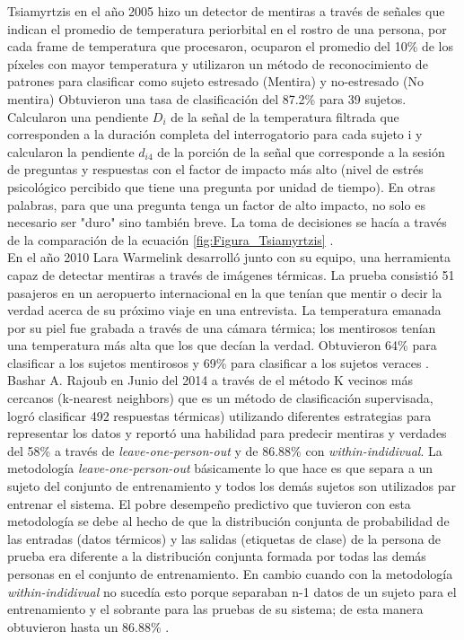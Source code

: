 \begin{onehalfspacing}
Tsiamyrtzis en el año 2005 hizo un detector de mentiras a través de señales que indican el promedio de temperatura periorbital en el rostro de una persona, por cada frame de temperatura que procesaron, ocuparon el promedio del 10\% de los píxeles con mayor temperatura y utilizaron un método de reconocimiento de patrones para clasificar como sujeto estresado (Mentira) y no-estresado (No mentira) Obtuvieron una tasa de clasificación del 87.2\% para 39 sujetos.
Calcularon una pendiente \textit{$D_{i}$} de la señal de la temperatura filtrada que corresponden a la duración completa del interrogatorio para cada sujeto i y calcularon la pendiente \textit{$d_{i4}$} de la porción de la señal que corresponde a la sesión de preguntas y respuestas con el factor de impacto más alto (nivel de estrés psicológico percibido que tiene una pregunta por unidad de tiempo). En otras palabras, para que una pregunta tenga un factor de alto impacto, no solo es necesario ser "duro" sino también breve. La toma de decisiones se hacía a través de la comparación de la ecuación \ref{fig:Figura_Tsiamyrtzis}
\cite{Tsiamyrtzis2005LieVideo}.\\

En el año 2010 Lara Warmelink desarrolló junto con su equipo, una herramienta capaz de detectar mentiras a través de imágenes térmicas. La prueba consistió 51 pasajeros en un aeropuerto internacional en la que tenían que mentir o decir la verdad acerca de su próximo viaje en una entrevista. La temperatura emanada por su piel fue grabada a través de una cámara térmica; los mentirosos tenían una temperatura más alta que los que decían la verdad. Obtuvieron 64\% para clasificar a los sujetos mentirosos y 69\% para clasificar a los sujetos veraces \cite{Warmelink2011ThermalAirports}.\\

Bashar A. Rajoub en Junio del 2014 a través de el método K vecinos más cercanos (k-nearest neighbors) que es un método de clasificación supervisada, logró clasificar 492 respuestas térmicas) utilizando diferentes estrategias para representar los datos y reportó una habilidad para predecir mentiras y verdades del 58\% a través de \textit{leave-one-person-out} y de 86.88\% con \textit{within-indidivual}. La metodología \textit{leave-one-person-out} básicamente lo que hace es que separa a un sujeto del conjunto de entrenamiento y todos los demás sujetos son utilizados par entrenar el sistema. El pobre desempeño predictivo que tuvieron con esta metodología se debe al hecho de que la distribución conjunta de probabilidad de las entradas (datos térmicos) y las salidas (etiquetas de clase) de la persona de prueba era diferente a la distribución conjunta formada por todas las demás personas en el conjunto de entrenamiento. En cambio cuando con la metodología \textit{within-indidivual} no sucedía esto porque separaban n-1 datos de un sujeto para el entrenamiento y el sobrante para las pruebas de su sistema; de esta manera obtuvieron hasta un 86.88\% \cite{Rajoub2014ThermalDetection}.\\


\end{onehalfspacing}
